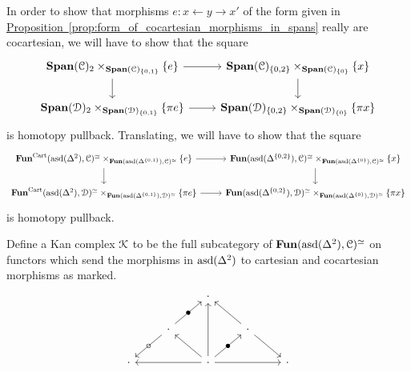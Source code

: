 \documentclass[main.tex]{subfiles}
\begin{document}
In order to show that morphisms $e\colon x \leftarrow y \rightarrow x'$ of the form given in \hyperref[prop:form_of_cocartesian_morphisms_in_spans]{Proposition~\ref*{prop:form_of_cocartesian_morphisms_in_spans}} really are cocartesian, we will have to show that the square
\begin{equation*}
  \begin{tikzcd}
    \Span(\category{C})_{2} \times_{\Span(\category{C})_{\{0, 1\}}} \{e\}
    \arrow[r]
    \arrow[d]
    & \Span(\category{C})_{\{0, 2\}} \times_{\Span(\category{C})_{\{0\}}} \{x\}
    \arrow[d]
    \\
    \Span(\category{D})_{2} \times_{\Span(\category{D})_{\{0, 1\}}} \{\pi e\}
    \arrow[r]
    & \Span(\category{D})_{\{0, 2\}} \times_{\Span(\category{D})_{\{0\}}} \{\pi x\}
  \end{tikzcd}
\end{equation*}
is homotopy pullback. Translating, we will have to show that the square
\begin{equation*}
  \begin{tikzcd}
    \Fun^{\Cart}(\asd(\Delta^{2}), \category{C})^{\simeq} \times_{\Fun(\asd(\Delta^{\{0, 1\}}), \category{C})^{\simeq}} \{e\}
    \arrow[r]
    \arrow[d]
    & \Fun(\asd(\Delta^{\{0, 2\}}), \category{C})^{\simeq} \times_{\Fun(\asd(\Delta^{\{0\}}), \category{C})^{\simeq}} \{x\}
    \arrow[d]
    \\
    \Fun^{\Cart}(\asd(\Delta^{2}), \category{D})^{\simeq} \times_{\Fun(\asd(\Delta^{\{0, 1\}}), \category{D})^{\simeq}} \{\pi e\}
    \arrow[r]
    & \Fun(\asd(\Delta^{\{0, 2\}}), \category{D})^{\simeq} \times_{\Fun(\asd(\Delta^{\{0\}}), \category{D})^{\simeq}} \{\pi x\}
  \end{tikzcd}
\end{equation*}
is homotopy pullback.

Define a Kan complex $\mathcal{K}$ to be the full subcategory of $\mathbf{Fun}(\mathrm{asd}(\Delta^{2}), \mathcal{C})^{\simeq}$ on functors which send the morphisms in $\mathrm{asd}(\Delta^{2})$ to cartesian and cocartesian morphisms as marked.
\begin{equation*}
  \begin{tikzcd}
    && \cdot
    \\
    & \cdot
    \arrow[ur, "\bullet" marking]
    \arrow[dl, "\circ" marking]
    && \cdot
    \arrow[ul]
    \arrow[dr]
    \\
    \cdot
    && \cdot
    \arrow[ll]
    \arrow[rr]
    \arrow[uu]
    \arrow[ur, "\bullet" marking]
    \arrow[ul]
    && \cdot
  \end{tikzcd}
\end{equation*}
\end{document}
